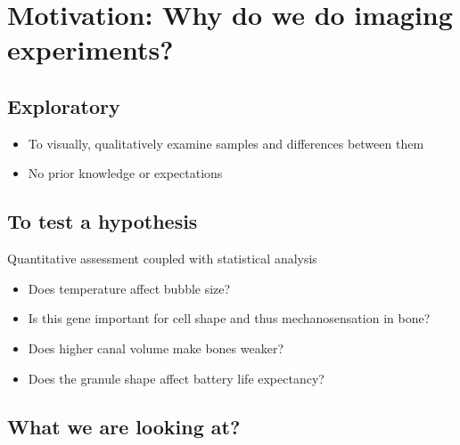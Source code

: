 \documentclass[letterpaper,10pt,english]{sphinxmanual}
\begin{document}
\chapter{Motivation:  Why do we do imaging experiments?}
\label{\detokenize{04-BasicSegmentation:motivation-why-do-we-do-imaging-experiments}}

\section{Exploratory}
\label{\detokenize{04-BasicSegmentation:exploratory}}\begin{itemize}
\item {} 
\sphinxAtStartPar
To visually, qualitatively examine samples and differences between them

\item {} 
\sphinxAtStartPar
No prior knowledge or expectations

\end{itemize}


\section{To test a hypothesis}
\label{\detokenize{04-BasicSegmentation:to-test-a-hypothesis}}
\sphinxAtStartPar
Quantitative assessment coupled with statistical analysis
\begin{itemize}
\item {} 
\sphinxAtStartPar
Does temperature affect bubble size?

\item {} 
\sphinxAtStartPar
Is this gene important for cell shape and thus mechanosensation in bone?

\item {} 
\sphinxAtStartPar
Does higher canal volume make bones weaker?

\item {} 
\sphinxAtStartPar
Does the granule shape affect battery life expectancy?

\end{itemize}


\section{What we are looking at?}
\label{\detokenize{04-BasicSegmentation:what-we-are-looking-at}}
\end{document}
